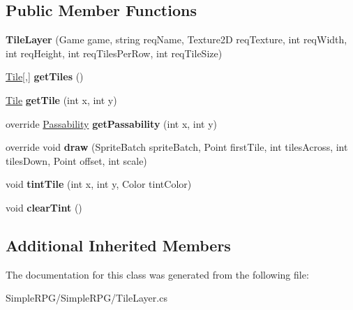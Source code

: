 \subsection*{Public Member Functions}
\begin{DoxyCompactItemize}
\item 
\hypertarget{class_simple_r_p_g_1_1_tile_layer_ace9183fa596c86f2df4a83014ca950f0}{{\bfseries Tile\-Layer} (Game game, string req\-Name, Texture2\-D req\-Texture, int req\-Width, int req\-Height, int req\-Tiles\-Per\-Row, int req\-Tile\-Size)}\label{class_simple_r_p_g_1_1_tile_layer_ace9183fa596c86f2df4a83014ca950f0}

\item 
\hypertarget{class_simple_r_p_g_1_1_tile_layer_a7cc0ae37cfbbc7dc82615bc6c63bf020}{\hyperlink{class_simple_r_p_g_1_1_tile}{Tile}\mbox{[},\mbox{]} {\bfseries get\-Tiles} ()}\label{class_simple_r_p_g_1_1_tile_layer_a7cc0ae37cfbbc7dc82615bc6c63bf020}

\item 
\hypertarget{class_simple_r_p_g_1_1_tile_layer_a8cac5f0cde30090519d897e526a3f57e}{\hyperlink{class_simple_r_p_g_1_1_tile}{Tile} {\bfseries get\-Tile} (int x, int y)}\label{class_simple_r_p_g_1_1_tile_layer_a8cac5f0cde30090519d897e526a3f57e}

\item 
\hypertarget{class_simple_r_p_g_1_1_tile_layer_a5e79fc6d88c3e907eedad7737c9c4e7e}{override \hyperlink{namespace_simple_r_p_g_a5f1ec21e7f4e36278a6cedd38c51e650}{Passability} {\bfseries get\-Passability} (int x, int y)}\label{class_simple_r_p_g_1_1_tile_layer_a5e79fc6d88c3e907eedad7737c9c4e7e}

\item 
\hypertarget{class_simple_r_p_g_1_1_tile_layer_a559edc2f802575814d4e3d762023b878}{override void {\bfseries draw} (Sprite\-Batch sprite\-Batch, Point first\-Tile, int tiles\-Across, int tiles\-Down, Point offset, int scale)}\label{class_simple_r_p_g_1_1_tile_layer_a559edc2f802575814d4e3d762023b878}

\item 
\hypertarget{class_simple_r_p_g_1_1_tile_layer_a7671848d8a5937ba5c73bde28a1f2e11}{void {\bfseries tint\-Tile} (int x, int y, Color tint\-Color)}\label{class_simple_r_p_g_1_1_tile_layer_a7671848d8a5937ba5c73bde28a1f2e11}

\item 
\hypertarget{class_simple_r_p_g_1_1_tile_layer_a4dbc526d42d95a5bfd8a5cc04a7cc2f2}{void {\bfseries clear\-Tint} ()}\label{class_simple_r_p_g_1_1_tile_layer_a4dbc526d42d95a5bfd8a5cc04a7cc2f2}

\end{DoxyCompactItemize}
\subsection*{Additional Inherited Members}


The documentation for this class was generated from the following file\-:\begin{DoxyCompactItemize}
\item 
Simple\-R\-P\-G/\-Simple\-R\-P\-G/Tile\-Layer.\-cs\end{DoxyCompactItemize}
